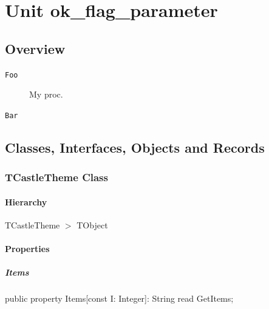 \documentclass{report}
\begin{document}
\newlength{\tmplength}
\chapter{Unit ok{\_}flag{\_}parameter}
\section{Overview}
\begin{description}
\item[\texttt{\begin{ttfamily}TCastleTheme\end{ttfamily} Class}]
\end{description}
\begin{description}
\item[\texttt{Foo}]My proc.
\item[\texttt{Bar}]
\end{description}
\section{Classes, Interfaces, Objects and Records}
\subsection*{TCastleTheme Class}
\subsubsection*{\large{\textbf{Hierarchy}}\normalsize\hspace{1ex}\hfill}
TCastleTheme {$>$} TObject
\subsubsection*{\large{\textbf{Properties}}\normalsize\hspace{1ex}\hfill}
\paragraph*{Items}\hspace*{\fill}

\begin{list}{}{
\setlength{\itemindent}{0cm}
\setlength{\listparindent}{0cm}
\setlength{\leftmargin}{\evensidemargin}
\addtolength{\leftmargin}{\tmplength}
\settowidth{\labelsep}{X}
\addtolength{\leftmargin}{\labelsep}
\setlength{\labelwidth}{\tmplength}
}
\begin{flushleft}
\item[\textbf{Declaration}\hfill]
\begin{ttfamily}
public property Items[const I: Integer]: String read GetItems;\end{ttfamily}


\end{flushleft}
\end{list}
\end{document}
